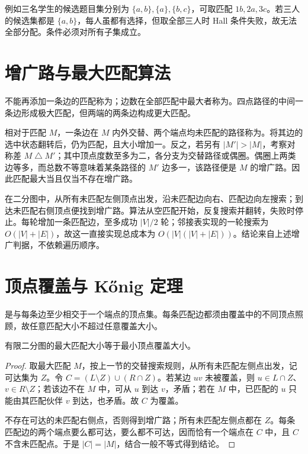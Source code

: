 \documentclass[UTF8,12pt,a4paper,fontset=fandol]{ctexbook}
\begin{document}
例如三名学生的候选题目集分别为 $\{a,b\},\{a\},\{b,c\}$，可取匹配 $1b,2a,3c$。若三人的候选集都是 $\{a,b\}$，每人虽都有选择，但取全部三人时 Hall 条件失败，故无法全部分配。条件必须对所有子集成立。

\section{增广路与最大匹配算法}

不能再添加一条边的匹配称为；边数在全部匹配中最大者称为。四点路径的中间一条边形成极大匹配，但两端的两条边构成更大匹配。

相对于匹配 $M$，一条边在 $M$ 内外交替、两个端点均未匹配的路径称为。将其边的选中状态翻转后，仍为匹配，且大小增加一。反之，若另有 $|M'|>|M|$，考察对称差 $M\mathbin{\triangle}M'$；其中顶点度数至多为二，各分支为交替路径或偶圈。偶圈上两类边等多，而总数不等意味着某条路径的 $M'$ 边多一，该路径便是 $M$ 的增广路。因此匹配最大当且仅当不存在增广路。

在二分图中，从所有未匹配左侧顶点出发，沿未匹配边向右、匹配边向左搜索；到达未匹配右侧顶点便找到增广路。算法从空匹配开始，反复搜索并翻转，失败时停止。每轮增加一条匹配边，至多成功 $|V|/2$ 轮；邻接表实现的一轮搜索为 $O(|V|+|E|)$，故这一直接实现总成本为 $O(|V|(|V|+|E|))$。结论来自上述增广判据，不依赖遍历顺序。

\section{顶点覆盖与 K\H{o}nig 定理}

是与每条边至少相交于一个端点的顶点集。每条匹配边都须由覆盖中的不同顶点照顾，故任意匹配大小不超过任意覆盖大小。

\begin{theorem}[K\H{o}nig 定理]
有限二分图的最大匹配大小等于最小顶点覆盖大小。
\end{theorem}
\begin{proof}
取最大匹配 $M$，按上一节的交替搜索规则，从所有未匹配左侧点出发，记可达集为 $Z$。令 $C=(L\setminus Z)\cup(R\cap Z)$。若某边 $uv$ 未被覆盖，则 $u\in L\cap Z$、$v\in R\setminus Z$；若该边不在 $M$ 中，可从 $u$ 到达 $v$，矛盾；若在 $M$ 中，已匹配的 $u$ 只能由其匹配伙伴 $v$ 到达，也矛盾。故 $C$ 为覆盖。

不存在可达的未匹配右侧点，否则得到增广路；所有未匹配左侧点都在 $Z$。每条匹配边的两个端点要么都可达，要么都不可达，因而恰有一个端点在 $C$ 中，且 $C$ 不含未匹配点。于是 $|C|=|M|$，结合一般不等式得到结论。
\end{proof}
\end{document}
